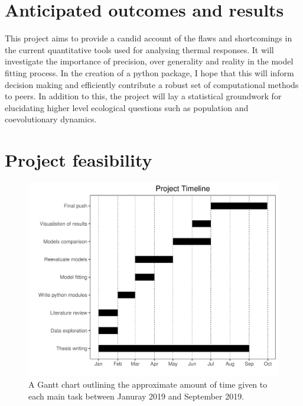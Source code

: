 \documentclass[
11pt, %
onehalfspacing, %
parskip, %
headsepline, %
]{article} %
\begin{document}
\maketitle
\section*{Anticipated outcomes and results}
This project aims to provide a candid account of the flaws and shortcomings in the current quantitative tools used for analysing thermal responses. It will investigate the importance of precision, over generality and reality in the model fitting process. In the creation of a python package, I hope that this will inform decision making and efficiently contribute a robust set of computational methods to peers. In addition to this, the project will lay a statistical groundwork for elucidating higher level ecological questions such as population and coevolutionary dynamics.

\maketitle
\section*{Project feasibility}
\begin{figure}[H]
      \includegraphics[width = 1\textwidth]{../Data/Project_timeline.PDF}
      \caption{A Gantt chart outlining the approximate amount of time given to each main task between Januray 2019 and September 2019.}
\end{figure}
\end{document}
